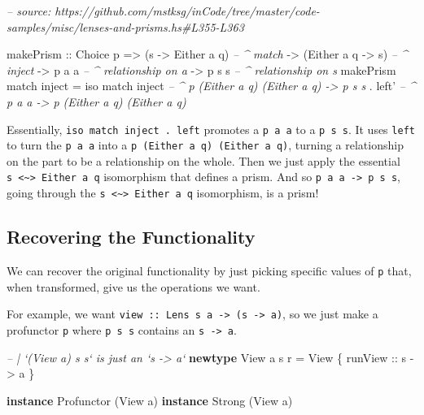 \documentclass[]{article}
\newenvironment{Shaded}{}{}
\newcommand{\CommentTok}[1]{\textcolor[rgb]{0.38,0.63,0.69}{\textit{#1}}}
\newcommand{\DataTypeTok}[1]{\textcolor[rgb]{0.56,0.13,0.00}{#1}}
\newcommand{\FunctionTok}[1]{\textcolor[rgb]{0.02,0.16,0.49}{#1}}
\newcommand{\KeywordTok}[1]{\textcolor[rgb]{0.00,0.44,0.13}{\textbf{#1}}}
\newcommand{\NormalTok}[1]{#1}
\newcommand{\OtherTok}[1]{\textcolor[rgb]{0.00,0.44,0.13}{#1}}
\begin{document}
\begin{Shaded}
\begin{Highlighting}[]
\CommentTok{-- source: https://github.com/mstksg/inCode/tree/master/code-samples/misc/lenses-and-prisms.hs#L355-L363}

\NormalTok{makePrism}
\OtherTok{    ::} \DataTypeTok{Choice}\NormalTok{ p}
    \OtherTok{=>}\NormalTok{ (s }\OtherTok{->} \DataTypeTok{Either}\NormalTok{ a q)    }\CommentTok{-- ^ match}
    \OtherTok{->}\NormalTok{ (}\DataTypeTok{Either}\NormalTok{ a q }\OtherTok{->}\NormalTok{ s)    }\CommentTok{-- ^ inject}
    \OtherTok{->}\NormalTok{ p a a                }\CommentTok{-- ^ relationship on a}
    \OtherTok{->}\NormalTok{ p s s                }\CommentTok{-- ^ relationship on s}
\NormalTok{makePrism match inject }\FunctionTok{=}
\NormalTok{    iso match inject   }\CommentTok{-- ^ p (Either a q) (Either a q) -> p s s}
  \FunctionTok{.}\NormalTok{ left'              }\CommentTok{-- ^ p a a -> p (Either a q) (Either a q)}
\end{Highlighting}
\end{Shaded}

Essentially, \texttt{iso\ match\ inject\ .\ left\textquotesingle{}} promotes a
\texttt{p\ a\ a} to a \texttt{p\ s\ s}. It uses \texttt{left\textquotesingle{}}
to turn the \texttt{p\ a\ a} into a \texttt{p\ (Either\ a\ q)\ (Either\ a\ q)},
turning a relationship on the part to be a relationship on the whole. Then we
just apply the essential
\texttt{s\ \textless{}\textasciitilde{}\textgreater{}\ Either\ a\ q} isomorphism
that defines a prism. And so \texttt{p\ a\ a\ -\textgreater{}\ p\ s\ s}, going
through the \texttt{s\ \textless{}\textasciitilde{}\textgreater{}\ Either\ a\ q}
isomorphism, is a prism!

\hypertarget{recovering-the-functionality}{%
\subsection{Recovering the Functionality}\label{recovering-the-functionality}}

We can recover the original functionality by just picking specific values of
\texttt{p} that, when transformed, give us the operations we want.

For example, we want
\texttt{view\ ::\ Lens\textquotesingle{}\ s\ a\ -\textgreater{}\ (s\ -\textgreater{}\ a)},
so we just make a profunctor \texttt{p} where \texttt{p\ s\ s} contains an
\texttt{s\ -\textgreater{}\ a}.

\begin{Shaded}
\begin{Highlighting}[]
\CommentTok{-- | `(View a) s s` is just an `s -> a`}
\KeywordTok{newtype} \DataTypeTok{View}\NormalTok{ a s r }\FunctionTok{=} \DataTypeTok{View}\NormalTok{ \{}\OtherTok{ runView ::}\NormalTok{ s }\OtherTok{->}\NormalTok{ a \}}

\KeywordTok{instance} \DataTypeTok{Profunctor}\NormalTok{ (}\DataTypeTok{View}\NormalTok{ a)}
\KeywordTok{instance} \DataTypeTok{Strong}\NormalTok{ (}\DataTypeTok{View}\NormalTok{ a)}
\end{Highlighting}
\end{Shaded}
\end{document}

